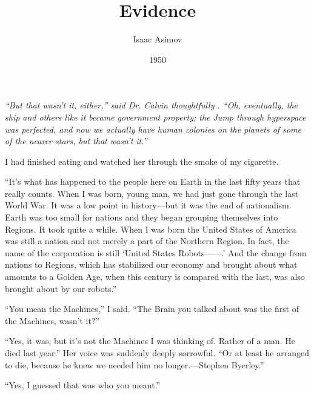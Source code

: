\documentclass[10pt,a5paper,twoside]{book}
\begin{document}
\title{Evidence}
\date{1950}
\author{Isaac Asimov}


\maketitle
\thispagestyle{empty}

\chapter*{}    
 \setcounter{page}{1}\noindent\linenumbers \itshape “But that wasn’t it, either,” said Dr. Calvin thoughtfully . “Oh, eventually, the ship and others like it became government property; the Jump through hyperspace was perfected, and now we actually have human colonies on the planets of some of the nearer stars, but that wasn’t it.”

I had finished eating and watched her through the smoke of my cigarette.

“It’s what has happened to the people here on Earth in the last fifty years that really counts. When I was born, young man, we had just gone through the last World War. It was a low point in history—but it was the end of nationalism. Earth was too small for nations and they began grouping themselves into Regions. It took quite a while. When I was born the United States of America was still a nation and not merely a part of the Northern Region. In fact, the name of the corporation is still ‘United States Robots——.’ And the change from nations to Regions, which has stabilized our economy and brought about what amounts to a Golden Age, when this century is compared with the last, was also brought about by our robots.”

“You mean the Machines,” I said. “The Brain you talked about was the first of the Machines, wasn’t it?”

“Yes, it was, but it’s not the Machines I was thinking of. Rather of a man. He died last year.” Her voice was suddenly deeply sorrowful. “Or at least he arranged to die, because he knew we needed him no longer.—Stephen Byerley.”

“Yes, I guessed that was who you meant.”
\end{document}
